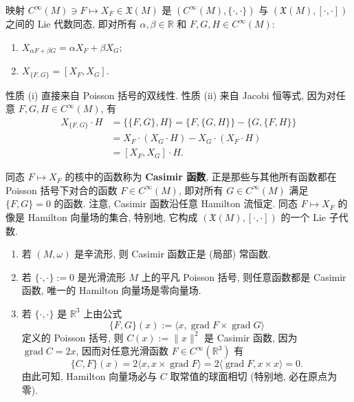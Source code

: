 \begin{RiemannProposition}\label{prop:poisson-and-vector-field-lie-homomorphism}
映射 $C^\infty(M)\ni F\mapsto X_F\in\mathfrak{X}(M)$ 是 $(C^\infty(M),\{\cdot,\cdot\})$ 与 $(\mathfrak{X}(M),[\cdot,\cdot])$ 之间的 Lie 代数同态, 即对所有 $\alpha,\beta\in\mathbb{R}$ 和 $F,G,H\in C^\infty(M)$:
\begin{enumerate}[label=(\roman*),leftmargin=*]
\item $X_{\alpha F+\beta G}=\alpha X_F+\beta X_G$;
\item $X_{\{F,G\}}=[X_F,X_G]$.
\end{enumerate}
\end{RiemannProposition}

\begin{RiemannProof}
性质 (i) 直接来自 Poisson 括号的双线性. 性质 (ii) 来自 Jacobi 恒等式, 因为对任意 $F,G,H\in C^\infty(M)$, 有
\begin{align*}
  X_{\{F,G\}}\cdot H
  &=\{\{F,G\},H\}=\{F,\{G,H\}\}-\{G,\{F,H\}\}\\
  &=X_F\cdot(X_G\cdot H)-X_G\cdot(X_F\cdot H)\\
  &=[X_F,X_G]\cdot H.
\end{align*}
\end{RiemannProof}

同态 $F\mapsto X_F$ 的核中的函数称为 \textbf{Casimir 函数}, 正是那些与其他所有函数都在 Poisson 括号下对合的函数 $F\in C^\infty(M)$, 即对所有 $G\in C^\infty(M)$ 满足 $\{F,G\}=0$ 的函数. 注意, Casimir 函数沿任意 Hamilton 流恒定. 同态 $F\mapsto X_F$ 的像是 Hamilton 向量场的集合, 特别地, 它构成 $(\mathfrak{X}(M),[\cdot,\cdot])$ 的一个 Lie 子代数.

\begin{RiemannExample}\label{ex:casimir-functions-and-spherical-level-sets}
\begin{enumerate}[label=(\arabic*),ref=\arabic*,leftmargin=*]
\item 若 $(M,\omega)$ 是辛流形, 则 Casimir 函数正是 (局部) 常函数.
\item 若 $\{\cdot,\cdot\}:=0$ 是光滑流形 $M$ 上的平凡 Poisson 括号, 则任意函数都是 Casimir 函数, 唯一的 Hamilton 向量场是零向量场.
\item 若 $\{\cdot,\cdot\}$ 是 $\mathbb{R}^3$ 上由公式
\[
  \{F,G\}(x):=\langle x,\operatorname{grad}F\times\operatorname{grad}G\rangle
\]
定义的 Poisson 括号, 则 $C(x):=\|x\|^2$ 是 Casimir 函数, 因为 $\operatorname{grad}C=2x$, 因而对任意光滑函数 $F\in C^\infty(\mathbb{R}^3)$ 有
\[
  \{C,F\}(x)=2\langle x,x\times\operatorname{grad}F\rangle
  =2\langle\operatorname{grad}F,x\times x\rangle=0.
\]
由此可知, Hamilton 向量场必与 $C$ 取常值的球面相切 (特别地, 必在原点为零).
\end{enumerate}
\end{RiemannExample}

